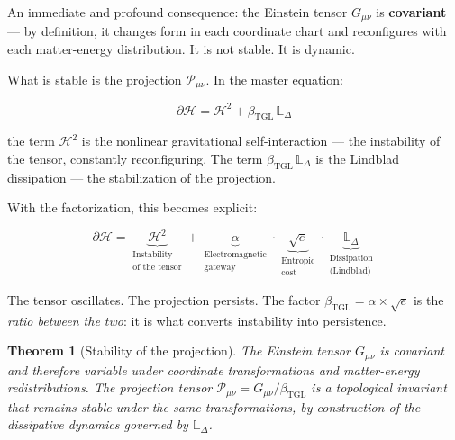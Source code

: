 \documentclass[12pt,a4paper,twoside]{article}
\newtheorem{theorem}{Theorem}[section]
\newcommand{\betatgl}{\beta_{\!\scriptscriptstyle\mathrm{TGL}}}
\begin{document}
An immediate and profound consequence: the Einstein tensor $G_{\mu\nu}$ is \textbf{covariant} --- by definition, it changes form in each coordinate chart and reconfigures with each matter-energy distribution. It is not stable. It is dynamic.

What is stable is the projection $\mathcal{P}_{\mu\nu}$. In the master equation:

\begin{equation}
\partial\mathcal{H} = \mathcal{H}^2 + \betatgl\,\mathbb{L}_\Delta
\end{equation}

\noindent the term $\mathcal{H}^2$ is the nonlinear gravitational self-interaction --- the instability of the tensor, constantly reconfiguring. The term $\betatgl\,\mathbb{L}_\Delta$ is the Lindblad dissipation --- the stabilization of the projection.

With the factorization, this becomes explicit:

\begin{equation}
\partial\mathcal{H} = \underbrace{\mathcal{H}^2}_{\substack{\text{Instability}\\\text{of the tensor}}} + \underbrace{\alpha}_{\substack{\text{Electromagnetic}\\\text{gateway}}} \cdot \underbrace{\sqrt{e}}_{\substack{\text{Entropic}\\\text{cost}}} \cdot \underbrace{\mathbb{L}_\Delta}_{\substack{\text{Dissipation}\\\text{(Lindblad)}}}
\label{eq:mestra_decomposta}
\end{equation}

The tensor oscillates. The projection persists. The factor $\betatgl = \alpha \times \sqrt{e}$ is the \textit{ratio between the two}: it is what converts instability into persistence.

\begin{theorem}[Stability of the projection]
\label{thm:estabilidade}
The Einstein tensor $G_{\mu\nu}$ is covariant and therefore variable under coordinate transformations and matter-energy redistributions. The projection tensor $\mathcal{P}_{\mu\nu} = G_{\mu\nu}/\betatgl$ is a topological invariant that remains stable under the same transformations, by construction of the dissipative dynamics governed by $\mathbb{L}_\Delta$.
\end{theorem}
\end{document}

